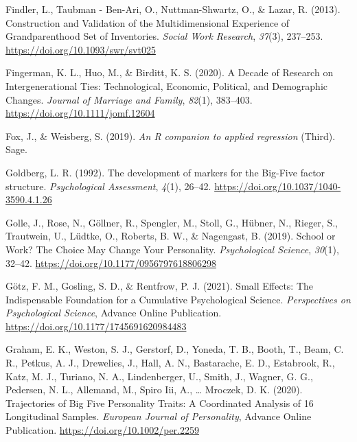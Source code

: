 \documentclass[
  english,
  man, noextraspace,floatsintext]{apa7}
\begin{document}
\leavevmode\hypertarget{ref-findlerConstructionValidationMultidimensional2013}{}%
Findler, L., Taubman - Ben-Ari, O., Nuttman-Shwartz, O., \& Lazar, R. (2013). Construction and Validation of the Multidimensional Experience of Grandparenthood Set of Inventories. \emph{Social Work Research}, \emph{37}(3), 237--253. \url{https://doi.org/10.1093/swr/svt025}

\leavevmode\hypertarget{ref-fingermanDecadeResearchIntergenerational2020}{}%
Fingerman, K. L., Huo, M., \& Birditt, K. S. (2020). A Decade of Research on Intergenerational Ties: Technological, Economic, Political, and Demographic Changes. \emph{Journal of Marriage and Family}, \emph{82}(1), 383--403. \url{https://doi.org/10.1111/jomf.12604}

\leavevmode\hypertarget{ref-car2019}{}%
Fox, J., \& Weisberg, S. (2019). \emph{An R companion to applied regression} (Third). Sage.

\leavevmode\hypertarget{ref-goldbergDevelopmentMarkersBigFive1992}{}%
Goldberg, L. R. (1992). The development of markers for the Big-Five factor structure. \emph{Psychological Assessment}, \emph{4}(1), 26--42. \url{https://doi.org/10.1037/1040-3590.4.1.26}

\leavevmode\hypertarget{ref-golleSchoolWorkChoice2019}{}%
Golle, J., Rose, N., Göllner, R., Spengler, M., Stoll, G., Hübner, N., Rieger, S., Trautwein, U., Lüdtke, O., Roberts, B. W., \& Nagengast, B. (2019). School or Work? The Choice May Change Your Personality. \emph{Psychological Science}, \emph{30}(1), 32--42. \url{https://doi.org/10.1177/0956797618806298}

\leavevmode\hypertarget{ref-gotzSmallEffectsIndispensable2021}{}%
Götz, F. M., Gosling, S. D., \& Rentfrow, P. J. (2021). Small Effects: The Indispensable Foundation for a Cumulative Psychological Science. \emph{Perspectives on Psychological Science}, Advance Online Publication. \url{https://doi.org/10.1177/1745691620984483}

\leavevmode\hypertarget{ref-grahamTrajectoriesBigFive2020}{}%
Graham, E. K., Weston, S. J., Gerstorf, D., Yoneda, T. B., Booth, T., Beam, C. R., Petkus, A. J., Drewelies, J., Hall, A. N., Bastarache, E. D., Estabrook, R., Katz, M. J., Turiano, N. A., Lindenberger, U., Smith, J., Wagner, G. G., Pedersen, N. L., Allemand, M., Spiro Iii, A., \ldots{} Mroczek, D. K. (2020). Trajectories of Big Five Personality Traits: A Coordinated Analysis of 16 Longitudinal Samples. \emph{European Journal of Personality}, Advance Online Publication. \url{https://doi.org/10.1002/per.2259}
\end{document}
